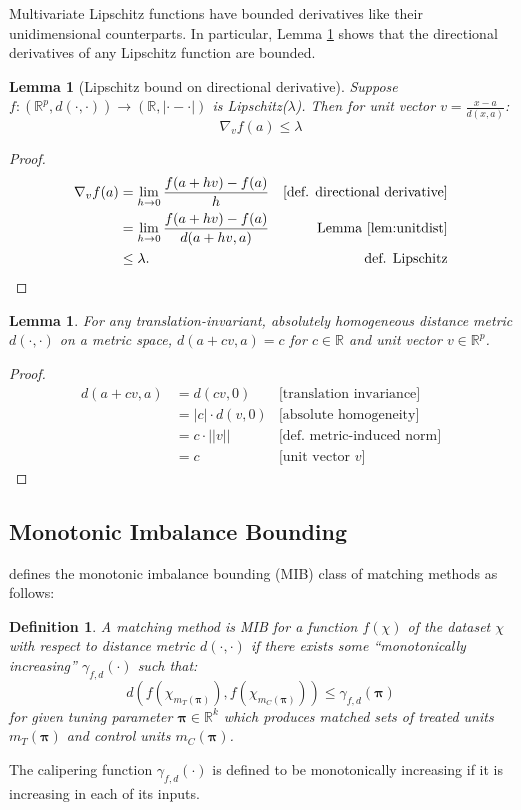 \documentclass{article}
\newtheorem{lemma}[theorem]{Lemma}
\newtheorem{definition}{Definition}[section]
\newcommand{\R}{\mathbb{R}}
\newcommand{\Rp}{\mathbb{R}^p}
\begin{document}
Multivariate Lipschitz functions have bounded derivatives like their unidimensional counterparts.
In particular, Lemma \ref{lem:lipbdsdd} shows that the directional derivatives of any Lipschitz function are bounded.
\begin{lemma}[Lipschitz bound on directional derivative]
\label{lem:lipbdsdd}
Suppose $f: (\Rp, d(\cdot, \cdot)) \to (\R, |\cdot - \cdot|)$ is Lipschitz($\lambda$).
Then for unit vector $v = \frac{x-a}{d(x,a)}$:
\begin{equation*}
    \nabla_v f(a) \leq \lambda
\end{equation*}
\end{lemma}
\begin{proof}
\begin{align*}
    \nabla_v f(a) 
    &= \lim_{h \to 0} \frac{f(a + hv) - f(a)}{h} &\text{[def. directional derivative]}\\
    &= \lim_{h \to 0} \frac{f(a + hv) - f(a)}{d(a + hv, a)} &\text{Lemma }\ref{lem:unitdist}\\
    &\leq \lambda. &\text{def. Lipschitz}
\end{align*}
\end{proof}

\begin{lemma}
\label{lem:unitdist}
For any translation-invariant, absolutely homogeneous distance metric $d(\cdot, \cdot)$ on a metric space, $d(a + cv, a) = c$ for $c \in \R$ and unit vector $v \in \Rp$.
\end{lemma}
\begin{proof}
\begin{align*}
    d(a + cv, a)
    &= d(cv, 0) &\text{[translation invariance]} \\
    &= |c| \cdot d(v, 0) &\text{[absolute homogeneity]} \\
    &= c \cdot ||v|| &\text{[def. metric-induced norm]} \\
    &= c &\text{[unit vector } v\text{]}
\end{align*}
\end{proof}

\subsection{Monotonic Imbalance Bounding}
\label{app:mib}

\citet{iacus2011multivariate} defines the monotonic imbalance bounding (MIB) class of matching methods as follows:
\begin{definition}
\label{def:mib}
    A matching method is MIB for a function $f(\chi)$ of the dataset $\chi$ with respect to distance metric $d(\cdot, \cdot)$ if there exists some ``monotonically increasing'' $\gamma_{f,d}(\cdot)$  such that:
    $$d(f(\chi_{m_T(\boldsymbol{\pi})}), f(\chi_{m_C(\boldsymbol{\pi})})) \leq \gamma_{f,d}(\boldsymbol{\pi})$$
    for given tuning parameter $\boldsymbol{\pi} \in \R^k$ which produces matched sets of treated units $m_T(\boldsymbol{\pi})$ and control units $m_C(\boldsymbol{\pi})$.
\end{definition}
The calipering function $\gamma_{f,d}(\cdot)$ is defined to be monotonically increasing if it is increasing in each of its inputs.
\end{document}
